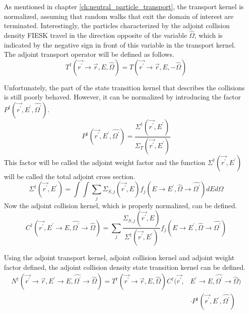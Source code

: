 As mentioned in chapter \ref{ch:neutral_particle_transport}, the transport 
kernel is normalized, assuming that random walks that exit the domain of 
interest are terminated. Interestingly, the particles characterized by the 
adjoint collision density FIESK travel in the direction opposite of the 
variable $\hat{\Omega}$, which is indicated by the negative sign in front of
this variable in the transport kernel. The adjoint transport operator will be
defined as follows.
\begin{equation}
  T^{\dagger}(\vec{r^{'}} \to \vec{r},E,\hat{\Omega}) = 
  T(\vec{r^{'}} \to \vec{r},E,-\hat{\Omega})
  \label{eq:adjoint_transport_kernel}
\end{equation}

Unfortunately, the part of the state transition kernel that describes the 
collisions is still poorly behaved. However, it can be normalized by 
introducing the factor $P^{\dagger}(\vec{r^{'}},E^{'},\hat{\Omega^{'}})$.
\begin{equation}
  P^{\dagger}(\vec{r^{'}},E^{'},\hat{\Omega^{'}}) = 
  \frac{\Sigma^{\dagger}(\vec{r^{'}},E^{'})}{\Sigma_T(\vec{r^{'}},E^{'})}
  \label{eq:adjoint_weight_factor}
\end{equation}
This factor will be called the adjoint weight factor and the function 
$\Sigma^{\dagger}(\vec{r^{'}},E^{'})$ will be called the total adjoint cross 
section.
\begin{equation}
  \Sigma^{\dagger}(\vec{r^{'}},E^{'}) = \int\int \sum_j \Sigma_{S,j}(\vec{r^{'}},E) 
      f_j(E \to E^{'}, \hat{\Omega} \to \hat{\Omega^{'}}) dE d\Omega
  \label{eq:adjoint_total_cross_section}
\end{equation}
Now the adjoint collision kernel, which is properly normalized, can be 
defined.
\begin{equation}
  C^{\dagger}(\vec{r^{'}},E^{'} \to E,\hat{\Omega^{'}} \to \hat{\Omega}) = 
  \sum_j \frac{\Sigma_{S,j}(\vec{r^{'}},E)}{\Sigma^{\dagger}(\vec{r^{'}},E^{'})}
  f_j(E \to E^{'},\hat{\Omega} \to \hat{\Omega^{'}})
  \label{eq:adjoint_collision_kernel}
\end{equation}

Using the adjoint transport kernel, adjoint collision kernel and adjoint
weight factor defined, the adjoint collision density state transition kernel
can be defined.
\begin{equation}
  \begin{split}
    N^{\dagger}(\vec{r^{'}} \to \vec{r},E^{'} \to E,\hat{\Omega^{'}} \to \hat{\Omega})
    = T^{\dagger}(\vec{r^{'}} \to \vec{r},E,\hat{\Omega})
    C^{\dagger}(\vec{r^{'}},&E^{'} \to E,\hat{\Omega^{'}} \to \hat{\Omega}) \\
    & \cdot P^{\dagger}(\vec{r^{'}},E^{'},\hat{\Omega^{'}})
  \end{split}
\end{equation}

